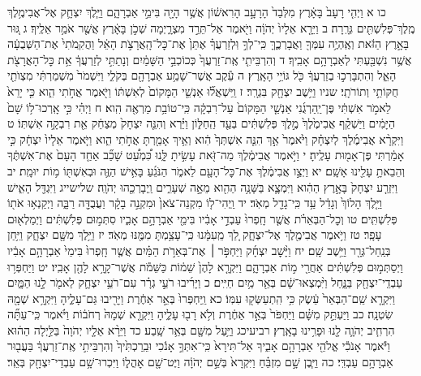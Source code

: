 \documentclass[twoside, openany, parskip=half, 11pt]{book}
\begin{document}
כו א וַיְהִ֤י רָעָב֙ בָּאָ֔רֶץ מִלְּבַד֙ הָרָעָ֣ב הָרִאשׁ֔וֹן אֲשֶׁ֥ר הָיָ֖ה בִּימֵ֣י אַבְרָהָ֑ם וַיֵּ֧לֶךְ יִצְחָ֛ק אֶל־אֲבִימֶ֥לֶךְ מֶֽלֶךְ־פְּלִשְׁתִּ֖ים גְּרָֽרָה׃ ב וַיֵּרָ֤א אֵלָיו֙ יְהֹוָ֔ה וַיֹּ֖אמֶר אַל־תֵּרֵ֣ד מִצְרָ֑יְמָה שְׁכֹ֣ן בָּאָ֔רֶץ אֲשֶׁ֖ר אֹמַ֥ר אֵלֶֽיךָ׃ ג גּ֚וּר בָּאָ֣רֶץ הַזֹּ֔את וְאֶֽהְיֶ֥ה עִמְּךָ֖ וַאֲבָרְכֶ֑ךָּ כִּֽי־לְךָ֣ וּֽלְזַרְעֲךָ֗ אֶתֵּן֙ אֶת־כׇּל־הָֽאֲרָצֹ֣ת הָאֵ֔ל וַהֲקִֽמֹתִי֙ אֶת־הַשְּׁבֻעָ֔ה אֲשֶׁ֥ר נִשְׁבַּ֖עְתִּי לְאַבְרָהָ֥ם אָבִֽיךָ׃ ד וְהִרְבֵּיתִ֤י אֶֽת־זַרְעֲךָ֙ כְּכוֹכְבֵ֣י הַשָּׁמַ֔יִם וְנָתַתִּ֣י לְזַרְעֲךָ֔ אֵ֥ת כׇּל־הָאֲרָצֹ֖ת הָאֵ֑ל וְהִתְבָּרְכ֣וּ בְזַרְעֲךָ֔ כֹּ֖ל גּוֹיֵ֥י הָאָֽרֶץ׃ ה עֵ֕קֶב אֲשֶׁר־שָׁמַ֥ע אַבְרָהָ֖ם בְּקֹלִ֑י וַיִּשְׁמֹר֙ מִשְׁמַרְתִּ֔י מִצְוֺתַ֖י חֻקּוֹתַ֥י וְתוֹרֹתָֽי׃ שניו וַיֵּ֥שֶׁב יִצְחָ֖ק בִּגְרָֽר׃ ז וַֽיִּשְׁאֲל֞וּ אַנְשֵׁ֤י הַמָּקוֹם֙ לְאִשְׁתּ֔וֹ וַיֹּ֖אמֶר אֲחֹ֣תִי הִ֑וא כִּ֤י יָרֵא֙ לֵאמֹ֣ר אִשְׁתִּ֔י פֶּן־יַֽהַרְגֻ֜נִי אַנְשֵׁ֤י הַמָּקוֹם֙ עַל־רִבְקָ֔ה כִּֽי־טוֹבַ֥ת מַרְאֶ֖ה הִֽוא׃ ח וַיְהִ֗י כִּ֣י אָֽרְכוּ־ל֥וֹ שָׁם֙ הַיָּמִ֔ים וַיַּשְׁקֵ֗ף אֲבִימֶ֙לֶךְ֙ מֶ֣לֶךְ פְּלִשְׁתִּ֔ים בְּעַ֖ד הַֽחַלּ֑וֹן וַיַּ֗רְא וְהִנֵּ֤ה יִצְחָק֙ מְצַחֵ֔ק אֵ֖ת רִבְקָ֥ה אִשְׁתּֽוֹ׃ ט וַיִּקְרָ֨א אֲבִימֶ֜לֶךְ לְיִצְחָ֗ק וַיֹּ֙אמֶר֙ אַ֣ךְ הִנֵּ֤ה אִשְׁתְּךָ֙ הִ֔וא וְאֵ֥יךְ אָמַ֖רְתָּ אֲחֹ֣תִי הִ֑וא וַיֹּ֤אמֶר אֵלָיו֙ יִצְחָ֔ק כִּ֣י אָמַ֔רְתִּי פֶּן־אָמ֖וּת עָלֶֽיהָ׃ י וַיֹּ֣אמֶר אֲבִימֶ֔לֶךְ מַה־זֹּ֖את עָשִׂ֣יתָ לָּ֑נוּ כִּ֠מְעַ֠ט שָׁכַ֞ב אַחַ֤ד הָעָם֙ אֶת־אִשְׁתֶּ֔ךָ וְהֵבֵאתָ֥ עָלֵ֖ינוּ אָשָֽׁם׃ יא וַיְצַ֣ו אֲבִימֶ֔לֶךְ אֶת־כׇּל־הָעָ֖ם לֵאמֹ֑ר הַנֹּגֵ֜עַ בָּאִ֥ישׁ הַזֶּ֛ה וּבְאִשְׁתּ֖וֹ מ֥וֹת יוּמָֽת׃ יב וַיִּזְרַ֤ע יִצְחָק֙ בָּאָ֣רֶץ הַהִ֔וא וַיִּמְצָ֛א בַּשָּׁנָ֥ה הַהִ֖וא מֵאָ֣ה שְׁעָרִ֑ים וַֽיְבָרְכֵ֖הוּ יְהֹוָֽה׃ שלישייג וַיִּגְדַּ֖ל הָאִ֑ישׁ וַיֵּ֤לֶךְ הָלוֹךְ֙ וְגָדֵ֔ל עַ֥ד כִּֽי־גָדַ֖ל מְאֹֽד׃ יד וַֽיְהִי־ל֤וֹ מִקְנֵה־צֹאן֙ וּמִקְנֵ֣ה בָקָ֔ר וַעֲבֻדָּ֖ה רַבָּ֑ה וַיְקַנְא֥וּ אֹת֖וֹ פְּלִשְׁתִּֽים׃ טו וְכׇל־הַבְּאֵרֹ֗ת אֲשֶׁ֤ר חָֽפְרוּ֙ עַבְדֵ֣י אָבִ֔יו בִּימֵ֖י אַבְרָהָ֣ם אָבִ֑יו סִתְּמ֣וּם פְּלִשְׁתִּ֔ים וַיְמַלְא֖וּם עָפָֽר׃ טז וַיֹּ֥אמֶר אֲבִימֶ֖לֶךְ אֶל־יִצְחָ֑ק לֵ֚ךְ מֵֽעִמָּ֔נוּ כִּֽי־עָצַ֥מְתָּ מִמֶּ֖נּוּ מְאֹֽד׃ יז וַיֵּ֥לֶךְ מִשָּׁ֖ם יִצְחָ֑ק וַיִּ֥חַן בְּנַֽחַל־גְּרָ֖ר וַיֵּ֥שֶׁב שָֽׁם׃ יח וַיָּ֨שׇׁב יִצְחָ֜ק וַיַּחְפֹּ֣ר ׀ אֶת־בְּאֵרֹ֣ת הַמַּ֗יִם אֲשֶׁ֤ר חָֽפְרוּ֙ בִּימֵי֙ אַבְרָהָ֣ם אָבִ֔יו וַיְסַתְּמ֣וּם פְּלִשְׁתִּ֔ים אַחֲרֵ֖י מ֣וֹת אַבְרָהָ֑ם וַיִּקְרָ֤א לָהֶן֙ שֵׁמ֔וֹת כַּשֵּׁמֹ֕ת אֲשֶׁר־קָרָ֥א לָהֶ֖ן אָבִֽיו׃ יט וַיַּחְפְּר֥וּ עַבְדֵֽי־יִצְחָ֖ק בַּנָּ֑חַל וַיִּ֨מְצְאוּ־שָׁ֔ם בְּאֵ֖ר מַ֥יִם חַיִּֽים׃ כ וַיָּרִ֜יבוּ רֹעֵ֣י גְרָ֗ר עִם־רֹעֵ֥י יִצְחָ֛ק לֵאמֹ֖ר לָ֣נוּ הַמָּ֑יִם וַיִּקְרָ֤א שֵֽׁם־הַבְּאֵר֙ עֵ֔שֶׂק כִּ֥י הִֽתְעַשְּׂק֖וּ עִמּֽוֹ׃ כא וַֽיַּחְפְּרוּ֙ בְּאֵ֣ר אַחֶ֔רֶת וַיָּרִ֖יבוּ גַּם־עָלֶ֑יהָ וַיִּקְרָ֥א שְׁמָ֖הּ שִׂטְנָֽה׃ כב וַיַּעְתֵּ֣ק מִשָּׁ֗ם וַיַּחְפֹּר֙ בְּאֵ֣ר אַחֶ֔רֶת וְלֹ֥א רָב֖וּ עָלֶ֑יהָ וַיִּקְרָ֤א שְׁמָהּ֙ רְחֹב֔וֹת וַיֹּ֗אמֶר כִּֽי־עַתָּ֞ה הִרְחִ֧יב יְהֹוָ֛ה לָ֖נוּ וּפָרִ֥ינוּ בָאָֽרֶץ׃ רביעיכג וַיַּ֥עַל מִשָּׁ֖ם בְּאֵ֥ר שָֽׁבַע׃ כד וַיֵּרָ֨א אֵלָ֤יו יְהֹוָה֙ בַּלַּ֣יְלָה הַה֔וּא וַיֹּ֕אמֶר אָנֹכִ֕י אֱלֹהֵ֖י אַבְרָהָ֣ם אָבִ֑יךָ אַל־תִּירָא֙ כִּֽי־אִתְּךָ֣ אָנֹ֔כִי וּבֵֽרַכְתִּ֙יךָ֙ וְהִרְבֵּיתִ֣י אֶֽת־זַרְעֲךָ֔ בַּעֲב֖וּר אַבְרָהָ֥ם עַבְדִּֽי׃ כה וַיִּ֧בֶן שָׁ֣ם מִזְבֵּ֗חַ וַיִּקְרָא֙ בְּשֵׁ֣ם יְהֹוָ֔ה וַיֶּט־שָׁ֖ם אׇהֳל֑וֹ וַיִּכְרוּ־שָׁ֥ם עַבְדֵי־יִצְחָ֖ק בְּאֵֽר׃ 
\end{document}
